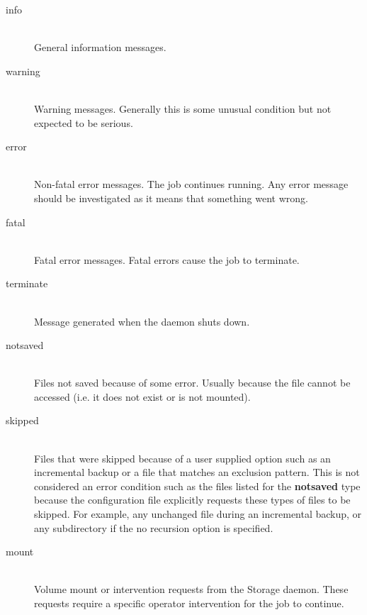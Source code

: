 \begin{description}

\item [info] \hfill \\
General information messages.

\item [warning] \hfill \\
Warning messages. Generally this is some  unusual condition but not expected
to be serious.

\item [error] \hfill \\
Non-fatal error messages. The job continues running.  Any error message should
be investigated as it means that something  went wrong.

\item [fatal] \hfill \\
Fatal error messages. Fatal errors cause the  job to terminate.

\item [terminate] \hfill \\
Message generated when the daemon shuts down.

\item [notsaved] \hfill \\
Files not saved because of some error.  Usually because the file cannot be
accessed (i.e. it does not  exist or is not mounted).

\item [skipped] \hfill \\
Files that were skipped because of a user supplied option such as an
incremental backup or a file that matches an exclusion pattern.  This is
not considered an error condition such as the files listed for the {\bf
notsaved} type because the configuration file explicitly requests these
types of files to be skipped.  For example, any unchanged file during an
incremental backup, or any subdirectory if the no recursion option is
specified.

\item [mount] \hfill \\
Volume mount or intervention requests from the Storage daemon.  These
requests require a specific operator intervention for the job to
continue.


\end{description}
